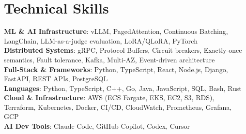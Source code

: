 \documentclass[letterpaper,11pt]{article}
\begin{document}
\section{Technical Skills}
\vspace{-7pt}
\begin{itemize}
[leftmargin=0.15in, label={}]\small{\item{
        \textbf{ML \& AI Infrastructure}{: vLLM, PagedAttention, Continuous Batching, LangChain, LLM-as-a-judge evaluation, LoRA/QLoRA, PyTorch} \\
        \textbf{Distributed Systems}{: gRPC, Protocol Buffers, Circuit breakers, Exactly-once semantics, Fault tolerance, Kafka, Multi-AZ, Event-driven architecture} \\
        \textbf{Full-Stack \& Frameworks}{: Python, TypeScript, React, Node.js, Django, FastAPI, REST APIs, PostgreSQL} \\
        \textbf{Languages}{: Python, TypeScript, C++, Go, Java, JavaScript, SQL, Bash, Rust} \\
        \textbf{Cloud \& Infrastructure}{: AWS (ECS Fargate, EKS, EC2, S3, RDS), Terraform, Kubernetes, Docker, CI/CD, CloudWatch, Prometheus, Grafana, GCP} \\
        \textbf{AI Dev Tools}{: Claude Code, GitHub Copilot, Codex, Cursor} \\
}}
\end{itemize}
\end{document}
